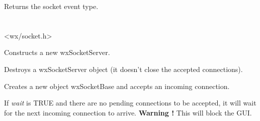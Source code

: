 \label{wxsocketeventsocketevent}


Returns the socket event type.

\section{}\label{wxsocketserver}




<wx/socket.h>


%
%
\label{wxsocketserverconstr}


Constructs a new wxSocketServer.




%
%


Destroys a wxSocketServer object (it doesn't close the accepted connections).

%
%
\label{wxsocketserveraccept}


Creates a new object wxSocketBase and accepts an incoming connection.

If {\it wait} is TRUE and there are no pending connections to be
accepted, it will wait for the next incoming connection to arrive.
{\bf Warning !} This will block the GUI.

